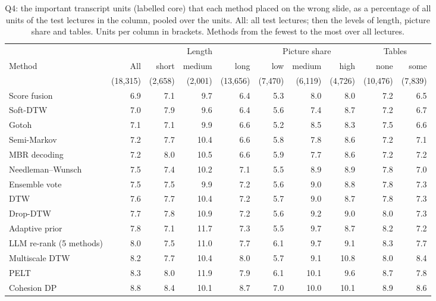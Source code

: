 \begin{table}[t]
\centering
\setlength{\tabcolsep}{1em}
\renewcommand{\arraystretch}{0.9}
\caption{Q4: the important transcript units (labelled core) that each method placed on the wrong slide, as a percentage of all units of the test lectures in the column, pooled over the units. All: all test lectures; then the levels of length, picture share and tables. Units per column in brackets. Methods from the fewest to the most over all lectures.}
\label{tab:q4}
\begin{tabular*}{\linewidth}{@{\extracolsep{\fill}}lrrrrrrrrr@{}}
\toprule
 & & \multicolumn{3}{c}{Length} & \multicolumn{3}{c}{Picture share} & \multicolumn{2}{c}{Tables} \\
\cmidrule(lr){3-5}\cmidrule(lr){6-8}\cmidrule(l){9-10}
Method & All & short & medium & long & low & medium & high & none & some \\
 & (18,315) & (2,658) & (2,001) & (13,656) & (7,470) & (6,119) & (4,726) & (10,476) & (7,839) \\
\midrule
Score fusion & 6.9 & 7.1 & 9.7 & 6.4 & 5.3 & 8.0 & 8.0 & 7.2 & 6.5 \\
Soft-DTW & 7.0 & 7.9 & 9.6 & 6.4 & 5.6 & 7.4 & 8.7 & 7.2 & 6.7 \\
Gotoh & 7.1 & 7.1 & 9.9 & 6.6 & 5.2 & 8.5 & 8.3 & 7.5 & 6.6 \\
Semi-Markov & 7.2 & 7.7 & 10.4 & 6.6 & 5.8 & 7.8 & 8.6 & 7.2 & 7.1 \\
MBR decoding & 7.2 & 8.0 & 10.5 & 6.6 & 5.9 & 7.7 & 8.6 & 7.2 & 7.2 \\
Needleman--Wunsch & 7.5 & 7.4 & 10.2 & 7.1 & 5.5 & 8.9 & 8.9 & 7.8 & 7.0 \\
Ensemble vote & 7.5 & 7.5 & 9.9 & 7.2 & 5.6 & 9.0 & 8.8 & 7.8 & 7.3 \\
DTW & 7.6 & 7.7 & 10.4 & 7.2 & 5.7 & 9.0 & 8.7 & 7.8 & 7.3 \\
Drop-DTW & 7.7 & 7.8 & 10.9 & 7.2 & 5.6 & 9.2 & 9.0 & 8.0 & 7.3 \\
Adaptive prior & 7.8 & 7.1 & 11.7 & 7.3 & 5.5 & 9.7 & 8.7 & 8.2 & 7.2 \\
LLM re-rank (5 methods) & 8.0 & 7.5 & 11.0 & 7.7 & 6.1 & 9.7 & 9.1 & 8.3 & 7.7 \\
Multiscale DTW & 8.2 & 7.7 & 10.4 & 8.0 & 5.7 & 9.1 & 10.8 & 8.0 & 8.4 \\
PELT & 8.3 & 8.0 & 11.9 & 7.9 & 6.1 & 10.1 & 9.6 & 8.7 & 7.8 \\
Cohesion DP & 8.8 & 8.4 & 10.1 & 8.7 & 7.0 & 10.0 & 10.1 & 8.9 & 8.6 \\

\end{tabular*}
\end{table}
